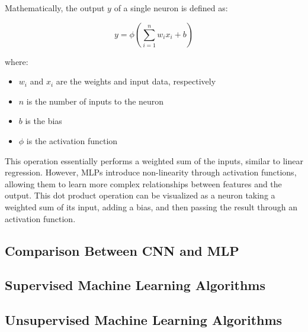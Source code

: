 \documentclass[
	article, %
	11pt, %
	draft, %
]{CSUniSchoolLabReport}
\begin{document}
Mathematically, the output \(y\) of a single neuron is defined as:

\[
y = \phi \left( \sum_{i=1}^{n} w_i x_i + b \right)
\]

where:
\begin{itemize}
  \item \(w_i\) and \(x_i\) are the weights and input data, respectively
  \item \(n\) is the number of inputs to the neuron
  \item \(b\) is the bias
  \item \(\phi\) is the activation function
\end{itemize}

This operation essentially performs a weighted sum of the inputs, similar to linear regression. However, MLPs introduce non-linearity through activation functions, allowing them to learn more complex relationships between features and the output. This dot product operation can be visualized as a neuron taking a weighted sum of its input, adding a bias, and then passing the result through an activation function.

\subsection{Comparison Between CNN and MLP}\label{cnn_vs_mlp}

\subsection{Supervised Machine Learning Algorithms}\label{sml}



\subsection{Unsupervised Machine Learning Algorithms}\label{uml}
\end{document}
